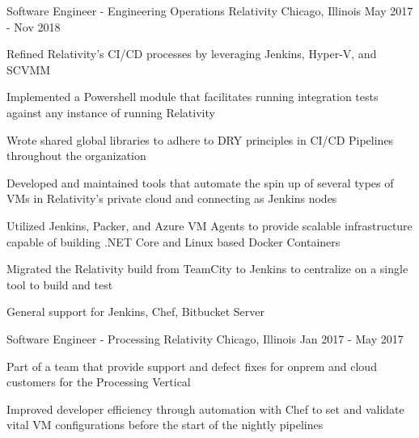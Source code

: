 
\begin{cventries}

  \cventry
    {Software Engineer - Engineering Operations} %
    {Relativity} %
    {Chicago, Illinois} %
    {May 2017 - Nov 2018} %
    {
      \begin{cvitems} %
        \item {Refined Relativity's CI/CD processes by leveraging Jenkins, Hyper-V, and SCVMM}
        \item {Implemented a Powershell module that facilitates running integration tests against any instance of running Relativity}
        \item {Wrote shared global libraries to adhere to DRY principles in CI/CD Pipelines throughout the organization}
        \item {Developed and maintained tools that automate the spin up of several types of VMs in Relativity's private cloud and connecting as Jenkins nodes}
        \item {Utilized Jenkins, Packer, and Azure VM Agents to provide scalable infrastructure capable of building .NET Core and Linux based Docker Containers}
        \item {Migrated the Relativity build from TeamCity to Jenkins to centralize on a single tool to build and test}
        \item {General support for Jenkins, Chef, Bitbucket Server}
      \end{cvitems}
    }
    
  \cventry
    {Software Engineer - Processing} %
    {Relativity} %
    {Chicago, Illinois} %
    {Jan 2017 - May 2017} %
    {
      \begin{cvitems} %
        \item {Part of a team that provide support and defect fixes for onprem and cloud customers for the Processing Vertical}
        \item {Improved developer efficiency through automation with Chef to set and validate vital VM configurations before the start of the nightly pipelines}
      \end{cvitems}
    }
    


\end{cventries}

